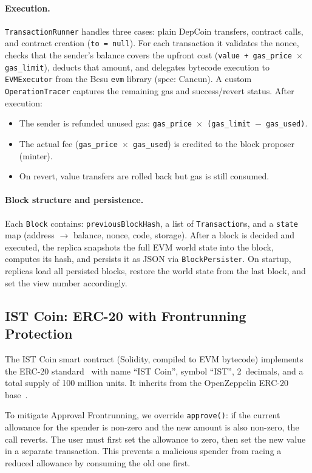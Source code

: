 \documentclass{llncs}
\begin{document}
\paragraph{Execution.} \texttt{TransactionRunner} handles three cases: plain DepCoin transfers, contract calls, and contract creation (\texttt{to = null}). For each transaction it validates the nonce, checks that the sender's balance covers the upfront cost (\texttt{value + gas\_price $\times$ gas\_limit}), deducts that amount, and delegates bytecode execution to \texttt{EVMExecutor} from the Besu \texttt{evm} library (spec: Cancun). A custom \texttt{OperationTracer} captures the remaining gas and success/revert status. After execution:
\begin{itemize}
    \item The sender is refunded unused gas: \texttt{gas\_price $\times$ (gas\_limit $-$ gas\_used)}.
    \item The actual fee (\texttt{gas\_price $\times$ gas\_used}) is credited to the block proposer (minter).
    \item On revert, value transfers are rolled back but gas is still consumed.
\end{itemize}

\paragraph{Block structure and persistence.} Each \texttt{Block} contains: \texttt{previousBlockHash}, a list of \texttt{Transaction}s, and a \texttt{state} map (address $\to$ balance, nonce, code, storage). After a block is decided and executed, the replica snapshots the full EVM world state into the block, computes its hash, and persists it as JSON via \texttt{BlockPersister}. On startup, replicas load all persisted blocks, restore the world state from the last block, and set the view number accordingly.

\subsection{IST Coin: ERC-20 with Frontrunning Protection}

The IST Coin smart contract (Solidity, compiled to EVM bytecode) implements the ERC-20 standard~\cite{erc20} with name ``IST Coin'', symbol ``IST'', 2~decimals, and a total supply of 100 million units. It inherits from the OpenZeppelin ERC-20 base~\cite{openzeppelin}.

To mitigate Approval Frontrunning, we override \texttt{approve()}: if the current allowance for the spender is non-zero and the new amount is also non-zero, the call reverts. The user must first set the allowance to zero, then set the new value in a separate transaction. This prevents a malicious spender from racing a reduced allowance by consuming the old one first.
\end{document}
